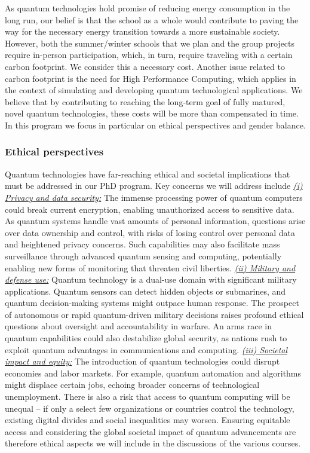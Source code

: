 \documentclass{scrreprt}
\begin{document}
As quantum technologies hold promise of reducing energy consumption in the long run, our belief is that the school as a whole would contribute to paving the way for the necessary energy transition towards a more sustainable society. However, both the summer/winter schools that we plan and the group projects require in-person participation, which, in turn, require traveling with a certain carbon footprint. We consider this a necessary cost. Another issue related to carbon footprint is the need for High Performance Computing, which applies in the context of simulating and developing quantum technological applications. We believe that by contributing to reaching the long-term goal of fully matured, novel quantum technologies, these costs will be more than compensated in time. In this program we focus in particular on ethical perspectives and gender balance.

\subsubsection{Ethical perspectives}
Quantum technologies have far-reaching ethical and societal implications that must be addressed in our PhD program. Key concerns we will address include \underline{\textit{(i) Privacy and data security:}} The immense processing power of quantum computers could break current encryption, enabling unauthorized access to sensitive data. As quantum systems handle vast amounts of personal information, questions arise over data ownership and control, with risks of losing control over personal data and heightened privacy concerns. Such capabilities may also facilitate mass surveillance through advanced quantum sensing and computing, potentially enabling new forms of monitoring that threaten civil liberties. \underline{\textit{(ii) Military and defense use:}} Quantum technology is a dual-use domain with significant military applications. Quantum sensors can detect hidden objects or submarines, and quantum decision-making systems might outpace human response. The prospect of autonomous or rapid quantum-driven military decisions raises profound ethical questions about oversight and accountability in warfare. An arms race in quantum capabilities could also destabilize global security, as nations rush to exploit quantum advantages in communications and computing. \underline{\textit{(iii) Societal impact and equity:}} The introduction of quantum technologies could disrupt economies and labor markets. For example, quantum automation and algorithms might displace certain jobs, echoing broader concerns of technological unemployment. There is also a risk that access to quantum computing will be unequal – if only a select few organizations or countries control the technology, existing digital divides and social inequalities may worsen. Ensuring equitable access and considering the global societal impact of quantum advancements are therefore ethical aspects we will include in the discussions of the various courses.
\end{document}
